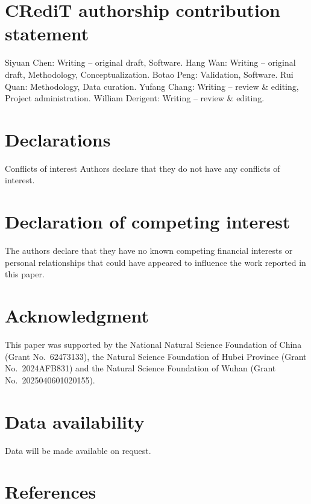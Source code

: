 \documentclass[
  10
]{article}
\begin{document}
\section{CRediT authorship contribution
statement}\label{credit-authorship-contribution-statement}

Siyuan Chen: Writing -- original draft, Software. Hang Wan: Writing --
original draft, Methodology, Conceptualization. Botao Peng: Validation,
Software. Rui Quan: Methodology, Data curation. Yufang Chang: Writing --
review \& editing, Project administration. William Derigent: Writing --
review \& editing.

\section{Declarations}\label{declarations}

Conflicts of interest Authors declare that they do not have any
conflicts of interest.

\section{Declaration of competing
interest}\label{declaration-of-competing-interest}

The authors declare that they have no known competing financial
interests or personal relationships that could have appeared to
influence the work reported in this paper.

\section{Acknowledgment}\label{acknowledgment}

This paper was supported by the National Natural Science Foundation of
China (Grant No.~62473133), the Natural Science Foundation of Hubei
Province (Grant No.~2024AFB831) and the Natural Science Foundation of
Wuhan (Grant No.~2025040601020155).

\section{Data availability}\label{data-availability}

Data will be made available on request.

\section{References}\label{references}
\end{document}
